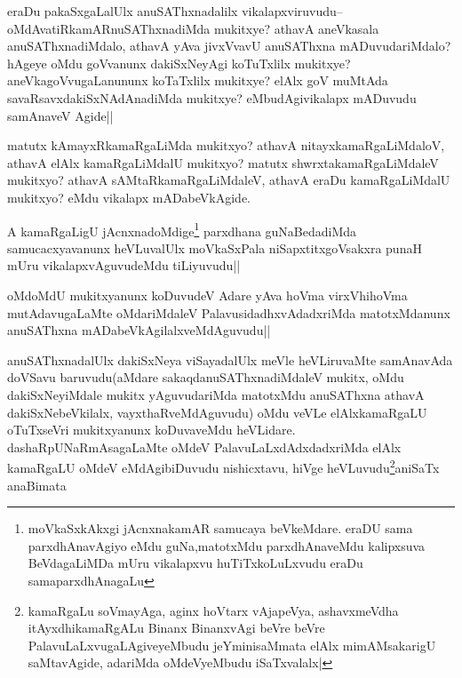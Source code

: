 \begin{artha}
eraDu pakaSxgaLalUlx anuSAThxnadalilx vikalapxviruvudu-- oMdAvatiRkamARnuSAThxnadiMda mukitxye? athavA aneVkasala anuSAThxnadiMdalo, athavA yAva jivxVvavU anuSAThxna mADuvudariMdalo? hAgeye oMdu goVvanunx dakiSxNeyAgi koTuTxlilx mukitxye? aneVkagoVvugaLanununx  koTaTxlilx mukitxye? elAlx goV muMtAda savaRsavxdakiSxNAdAnadiMda mukitxye? eMbudAgivikalapx mADuvudu samAnaveV Agide||
\end{artha}

\begin{artha}
matutx kAmayxRkamaRgaLiMda mukitxyo? athavA nitayxkamaRgaLiMdaloV, athavA elAlx kamaRgaLiMdalU mukitxyo? matutx shwrxtakamaRgaLiMdaleV mukitxyo? athavA sAMtaRkamaRgaLiMdaleV, athavA eraDu kamaRgaLiMdalU mukitxyo? eMdu vikalapx mADabeVkAgide. 
\end{artha}

\begin{artha}
A kamaRgaLigU jAcnxnadoMdige\footnote{moVkaSxkAkxgi jAcnxnakamAR samucaya beVkeMdare. eraDU sama parxdhAnavAgiyo eMdu guNa,matotxMdu parxdhAnaveMdu kalipxsuva BeVdagaLiMDa mUru vikalapxvu huTiTxkoLuLxvudu eraDu samaparxdhAnagaLu} parxdhana guNaBedadiMda samucacxyavanunx heVLuvalUlx moVkaSxPala niSapxtitxgoVsakxra punaH mUru vikalapxvAguvudeMdu tiLiyuvudu||
\end{artha}


\begin{artha}
oMdoMdU mukitxyanunx koDuvudeV Adare yAva hoVma virxVhihoVma mutAdavugaLaMte oMdariMdaleV PalavusidadhxvAdadxriMda matotxMdanunx anuSAThxna mADabeVkAgilalxveMdAguvudu||
\end{artha}

\begin{artha}
anuSAThxnadalUlx dakiSxNeya viSayadalUlx meVle heVLiruvaMte samAnavAda doVSavu baruvudu(aMdare sakaqdanuSAThxnadiMdaleV mukitx, oMdu dakiSxNeyiMdale mukitx yAguvudariMda matotxMdu anuSAThxna athavA dakiSxNebeVkilalx, vayxthaRveMdAguvudu) oMdu veVLe elAlxkamaRgaLU oTuTxseVri mukitxyanunx koDuvaveMdu heVLidare. dashaRpUNaRmAsagaLaMte oMdeV PalavuLaLxdAdxdadxriMda elAlx kamaRgaLU oMdeV eMdAgibiDuvudu nishicxtavu, hiVge heVLuvudu\footnote{kamaRgaLu soVmayAga, aginx hoVtarx vAjapeVya, ashavxmeVdha itAyxdhikamaRgALu Binanx BinanxvAgi beVre beVre PalavuLaLxvugaLAgiveyeMbudu jeYminisaMmata elAlx mimAMsakarigU saMtavAgide, adariMda oMdeVyeMbudu iSaTxvalalx|}aniSaTx anaBimata   
\end{artha}

